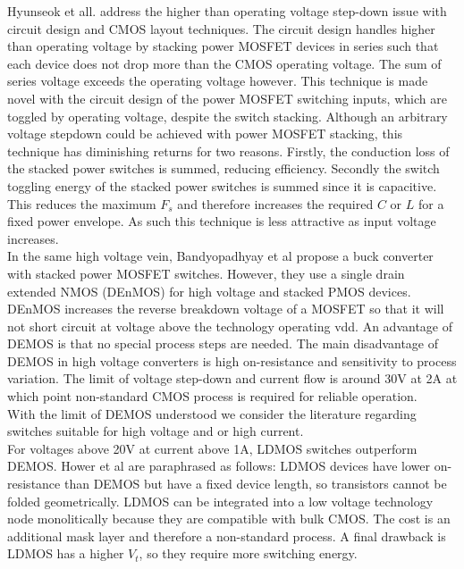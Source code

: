 \documentclass[letterpaper,twocolumn,10pt]{article}
\begin{document}
\indent Hyunseok et all.\cite{Hyunseok2012} address the higher than operating voltage step-down issue with circuit design and CMOS layout techniques. The circuit design handles higher than operating voltage by stacking power MOSFET devices in series such that each device does not drop more than the CMOS operating voltage. The sum of series voltage exceeds the operating voltage however. This technique is made novel with the circuit design of the power MOSFET switching inputs, which are toggled by operating voltage, despite the switch stacking. Although an arbitrary voltage stepdown could be achieved with power MOSFET stacking, this technique has diminishing returns for two reasons. Firstly, the conduction loss of the stacked power switches is summed, reducing efficiency. Secondly the switch toggling energy of the stacked power switches is summed since it is capacitive. This reduces the maximum $F_s$ and therefore increases the required $C$ or $L$ for a fixed power envelope. As such this technique is less attractive as input voltage increases.\\
\indent In the same high voltage vein, Bandyopadhyay et al\cite{Bandyopadhyay2011} propose a buck converter with stacked power MOSFET switches. However, they use a single drain extended NMOS (DEnMOS) for high voltage and stacked PMOS devices. DEnMOS increases the reverse breakdown voltage of a MOSFET so that it will not short circuit at voltage above the technology operating vdd. An advantage of DEMOS is that no special process steps are needed. The main disadvantage of DEMOS in high voltage converters is high on-resistance and sensitivity to process variation. The limit of voltage step-down and current flow is around 30V at 2A \cite{Hower2005} at which point non-standard CMOS process is required for reliable operation.\\
\indent With the limit of DEMOS understood we consider the literature regarding switches suitable for high voltage and or high current.\\
For voltages above 20V at current above 1A, LDMOS switches outperform DEMOS. Hower et al\cite{Hower2005} are paraphrased as follows: LDMOS devices have lower on-resistance than DEMOS but have a fixed device length, so transistors cannot be folded geometrically. LDMOS can be integrated into a low voltage technology node monolitically because they are compatible with bulk CMOS. The cost is an additional mask layer and therefore a non-standard process. A final drawback is LDMOS has a higher $V_t$, so they require more switching energy.\\
\end{document}
